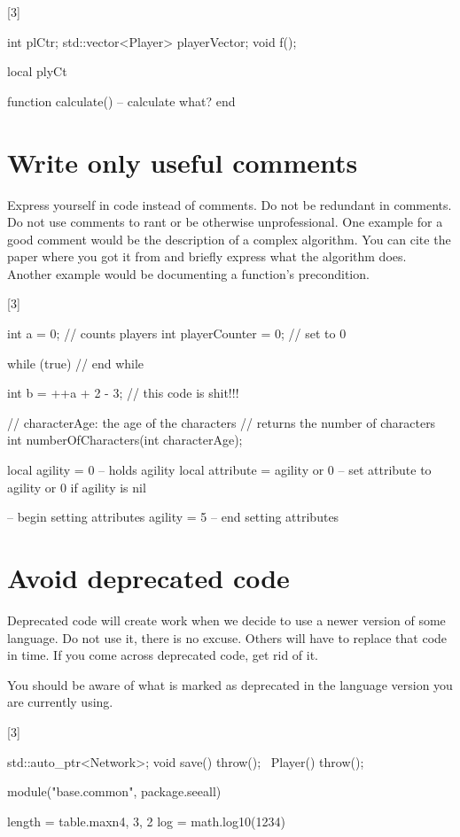 \documentclass[a4paper,11pt]{scrreprt}
\newcommand{\marginMarker}[1]{%
\marginnote{%
    \hfill%
		\Huge{#1}%
}[3\baselineskip]%
}
\newcommand{\nonconforming}{%
\marginMarker{\textcolor{red}{\ding{55}}}%
}
\begin{document}
\nonconforming{}
\begin{cppBox}
int plCtr;
std::vector<Player> playerVector;
void f();
\end{cppBox}
\begin{luaBox}
local plyCt

function calculate() -- calculate what?
end
\end{luaBox}

\section{Write only useful comments}
Express yourself in code instead of comments. Do not be redundant in comments. Do not use comments to rant or be otherwise unprofessional. One example for a good comment would be the description of a complex algorithm. You can cite the paper where you got it from and briefly express what the algorithm does. Another example would be documenting a function's precondition.

\nonconforming{}
\begin{cppBox}
int a = 0; // counts players
int playerCounter = 0; // set to 0

while (true) {
} // end while

int b = ++a + 2 - 3; // this code is shit!!!

// characterAge: the age of the characters
// returns the number of characters
int numberOfCharacters(int characterAge);
\end{cppBox}
\begin{luaBox}
local agility = 0 -- holds agility
local attribute = agility or 0 -- set attribute to agility or 0 if agility is nil

-- begin setting attributes
agility = 5
-- end setting attributes
\end{luaBox}

\section{Avoid deprecated code}
Deprecated code will create work when we decide to use a newer version of some language. Do not use it, there is no excuse. Others will have to replace that code in time. If you come across deprecated code, get rid of it.

You should be aware of what is marked as deprecated in the language version you are currently using.

\nonconforming{}
\begin{cppBox}
std::auto_ptr<Network>;
void save() throw();
~Player() throw();
\end{cppBox}
\begin{luaBox}
module("base.common", package.seeall)

length = table.maxn{4, 3, 2}
log = math.log10(1234)
\end{luaBox}
\end{document}
